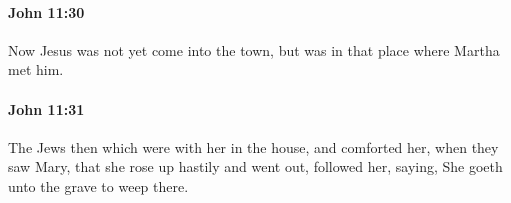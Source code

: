 		\paragraph{John 11:30} %
			\label{JOHN-11-30}

			Now Jesus was not yet come into the town, but was in that place where Martha met him.

			\begin{framed}
				\scriptsize
				\begin{compactdesc}
					\item[SBLG] 
				\end{compactdesc}
			\end{framed}

		\paragraph{John 11:31} %
			\label{JOHN-11-31}

			The Jews then which were with her in the house, and comforted her, when they saw Mary, that she rose up hastily and went out, followed her, saying, She goeth unto the grave to weep there.

